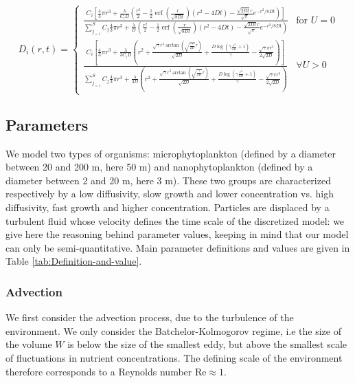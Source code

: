 \documentclass[english]{article}
\DeclareMathOperator\erf{erf}
\begin{document}
\begin{doublespace}
\begin{equation}
D_{i}(r,t)=\begin{cases}
\frac{C_{i}\left[\frac{4}{3}\pi r^{3}+\frac{\lambda}{C_{i}D}\left(\frac{r^{2}}{2}-\frac{1}{2}\erf(\frac{r}{\sqrt{8Dt}})(r^{2}-4Dt)-\frac{\sqrt{2Dt}r}{\sqrt{\pi}}e^{-r^{2}/8Dt}\right)\right]}{\sum_{j_{=1}}^{S}C_{j}\frac{4}{3}\pi r^{3}+\frac{\lambda}{D}\left(\frac{r^{2}}{2}-\frac{1}{2}\erf(\frac{r}{\sqrt{8Dt}})(r^{2}-4Dt)-\frac{\sqrt{2Dt}r}{\sqrt{\pi}}e^{-r^{2}/8Dt}\right)} & \text{for }U=0\\
\frac{C_{i}\left[\frac{4}{3}\pi r^{3}+\frac{\lambda}{3C_{i}D}\left(r^{2}+\frac{\sqrt{\gamma}r^{3}\arctan(\sqrt{\frac{\gamma}{2D}}r)}{\sqrt{2D}}+\frac{D\log\left(\gamma\frac{r^{2}}{2D}+1\right)}{\gamma}-\frac{\sqrt{\gamma}\pi r^{3}}{2\sqrt{2D}}\right)\right]}{\sum_{j_{=1}}^{S}C_{j}\frac{4}{3}\pi r^{3}+\frac{\lambda}{3D}\left(r^{2}+\frac{\sqrt{\gamma}r^{3}\arctan(\sqrt{\frac{\gamma}{2D}}r)}{\sqrt{2D}}+\frac{D\log\left(\gamma\frac{r^{2}}{2D}+1\right)}{\gamma}-\frac{\sqrt{\gamma}\pi r^{3}}{2\sqrt{2D}}\right)} & \forall U>0
\end{cases}
\end{equation}

\end{doublespace}

\subsection*{Parameters}

We model two types of organisms: microphytoplankton (defined by a
diameter between 20 and 200 \textmu m, here 50 \textmu m) and nanophytoplankton
(defined by a diameter between 2 and 20 \textmu m, here 3 \textmu
m). These two groups are characterized respectively by a low diffusivity,
slow growth and lower concentration vs. high diffusivity, fast growth
and higher concentration. Particles are displaced by a turbulent fluid
whose velocity defines the time scale of the discretized model: we
give here the reasoning behind parameter values, keeping in mind that
our model can only be semi-quantitative. Main parameter definitions
and values are given in Table \ref{tab:Definition-and-value}. 

\subsubsection*{Advection}

We first consider the advection process, due to the turbulence of
the environment. We only consider the Batchelor-Kolmogorov regime,
i.e the size of the volume $W$ is below the size of the smallest
eddy, but above the smallest scale of fluctuations in nutrient concentrations.
The defining scale of the environment therefore corresponds to a Reynolds
number $\text{Re}\approx1$.
\end{document}
